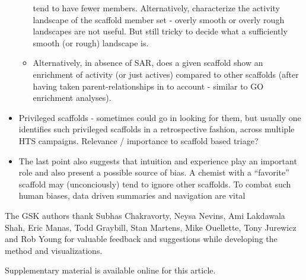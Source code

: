 \documentclass[journal=jacsat,manuscript=article]{achemso}
\begin{document}
\begin{itemize}
\begin{itemize}
    tend to have fewer members.  Alternatively, characterize the
    activity landscape of the scaffold member set - overly smooth or
    overly rough landscapes are not useful. But still tricky to decide
    what a sufficiently smooth (or rough) landscape is.
  \item Alternatively, in absence of SAR, does a given scaffold show
    an enrichment of activity (or just actives) compared to other
    scaffolds (after having taken parent-relationships in to account -
    similar to GO enrichment analyses).
  \end{itemize}
\item Privileged scaffolds - sometimes could go in looking for them,
  but usually one identifies such privileged scaffolds in a
  retrospective fashion, across multiple HTS campaigns. Relevance /
  importance to scaffold based triage?
\item The last point also suggests that intuition and experience play
  an important role and also present a possible source of bias. A
  chemist with a ``favorite'' scaffold may (unconciously) tend to
  ignore other scaffolds. To combat such human biases, data driven
  summaries and navigation are vital
\end{itemize}

\begin{acknowledgement}
  The GSK authors thank Subhas Chakravorty, Neysa Nevins, Ami Lakdawala Shah,
  Eric Manas, Todd Graybill, Stan Martens, Mike Ouellette, Tony Jurewicz and Rob
  Young for valuable feedback and suggestions while developing the method and
  visualizations.
\end{acknowledgement}

\begin{suppinfo}
Supplementary material is available online for this article.
\end{suppinfo}


\end{document}
